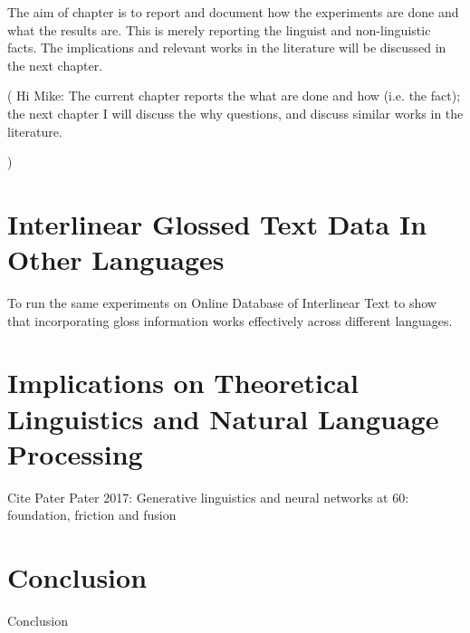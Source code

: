 \documentclass[final]{ua-thesis}
\numberwithin{equation}{section}
\begin{document}
The aim of chapter is to report and document how the experiments are done and what the results are. This is merely reporting the linguist and non-linguistic facts. The implications and relevant works in the literature will be discussed in the next chapter.   


(
Hi Mike: 
The current chapter reports the what are done and how (i.e. the fact);
the next chapter I will discuss the why questions, and discuss similar works in the literature.  

)


\chapter{Interlinear Glossed Text Data In Other Languages}
\label{chap:gloss_in_other_languages}

To run the same experiments on Online Database of Interlinear Text \citep{ODIN, Xia2016} to show that incorporating gloss information works effectively across different languages.  
\chapter{Implications on Theoretical Linguistics and Natural Language Processing}
\label{chap:Implications}

Cite Pater 
Pater 2017: Generative linguistics and neural networks at 60: foundation, friction and fusion
\chapter{Conclusion}
Conclusion






\end{document}
